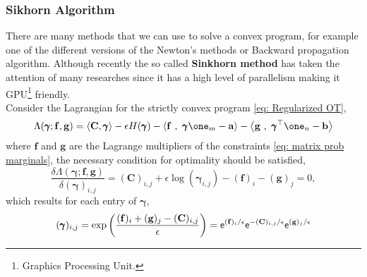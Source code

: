 \subsubsection{Sikhorn Algorithm}
There are many methods that we can use to solve a convex program, for example one of the different versions of the Newton's methods or Backward propagation algorithm. Although recently the so called \textbf{Sinkhorn method} has taken the attention of many researches since it has a high level of parallelism making it GPU\footnote{Graphics Processing Unit.} friendly.\\

Consider the Lagrangian for the strictly convex program \eqref{eq: Regularized OT},
\begin{equation}
	\Lambda(\pmb{\gamma};\mathbf{f}, \mathbf{g})=\anglesbox{\mathbf{C},\pmb{\gamma}}-\epsilon H(\pmb{\gamma})-\anglesbox{\mathbf{f}\ ,\ \pmb{\gamma}\one_m-\mathbf{a}}-\anglesbox{\mathbf{g}\ ,\ \pmb{\gamma}^\top\one_n-\mathbf{b}}
\end{equation}
where $\mathbf{f}$ and $\mathbf{g}$ are the Lagrange multipliers of the constraints \eqref{eq: matrix prob marginals}, the necessary condition for optimality should be satisfied,
\begin{equation}
	\frac{\delta\Lambda(\pmb{\gamma};\mathbf{f}, \mathbf{g})}{\delta (\pmb{\gamma})_{i,j}}=(\mathbf{C})_{i,j}+\epsilon\log(\pmb{\gamma}_{i,j})-(\mathbf{f})_i-(\mathbf{g})_{j}=0,
\end{equation}
which results for each entry of $\pmb{\gamma}$, 
\begin{equation}
	(\pmb{\gamma})_{i,j}=\exp\left( {\frac{(\mathbf{f})_i+(\mathbf{g})_{j}-(\mathbf{C})_{i,j}}{\epsilon}} \right)=\mathsf{e}^{(\mathbf{f})_i/\epsilon}\mathsf{e}^{-(\mathbf{C})_{i,j}/\epsilon}\mathsf{e}^{(\mathbf{g})_j/\epsilon}
\end{equation}

